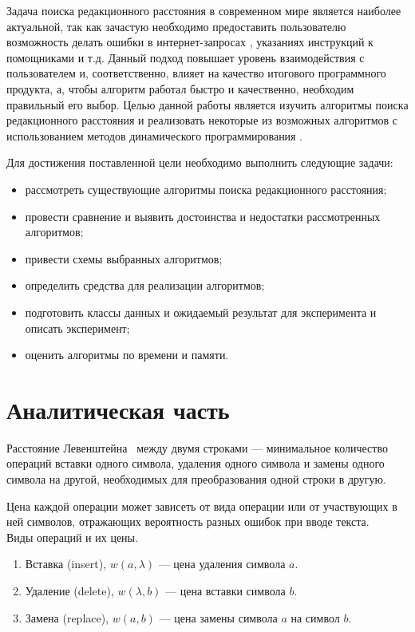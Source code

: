 \documentclass[12pt]{report}
\begin{document}
    Задача поиска редакционного расстояния в современном мире является наиболее актуальной, так как зачастую необходимо
    предоставить пользователю возможность делать ошибки в интернет-запросах \cite{search}, указаниях инструкций к помощниками и т.д.
    Данный подход повышает уровень взаимодействия с пользователем и, соответственно, влияет на качество итогового
    программного продукта, а, чтобы алгоритм работал быстро и качественно, необходим правильный его выбор.
    Целью данной работы является изучить алгоритмы поиска редакционного расстояния и реализовать некоторые из возможных
    алгоритмов с использованием методов динамического программирования \cite{dp}.

    Для достижения поставленной цели необходимо выполнить следующие задачи:

    \begin{itemize}
        \item рассмотреть существующие алгоритмы поиска редакционного расстояния;
        \item провести сравнение и выявить достоинства и недостатки рассмотренных алгоритмов;
        \item привести схемы выбранных алгоритмов;
        \item определить средства для реализации алгоритмов;
        \item подготовить классы данных и ожидаемый результат для эксперимента и описать эксперимент;
        \item оценить алгоритмы по времени и памяти.
    \end{itemize}


    \newpage


    \chapter{Аналитическая часть}

    Расстояние Левенштейна~\cite{levenshtein} между двумя строками ---
    минимальное количество операций вставки одного символа, удаления одного символа
    и замены одного символа на другой, необходимых для преобразования одной строки в другую.

    Цена каждой операции может зависеть от вида операции или от участвующих в ней символов, отражающих вероятность
    разных ошибок при вводе текста.
    \\
    Виды операций и их цены.
    \begin{enumerate}
        \item Вставка (insert), $w(a,\lambda)$ --- цена удаления символа $a$.
        \item Удаление (delete), $w(\lambda, b)$ --- цена вставки символа $b$.
        \item Замена (replace), $w(a, b)$ --- цена замены символа $a$ на символ $b$.
    \end{enumerate}
\end{document}
